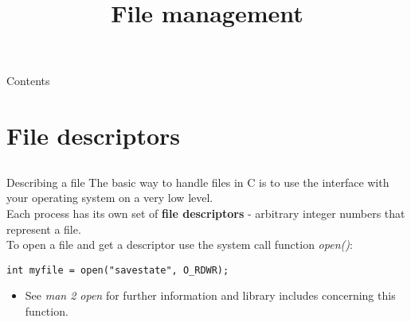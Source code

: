 
\newcommand{\topic}{
	File management
}

\title{\topic}
\supertitle{\course}
\date{}



\maketitle

\begin{frame}{Contents}
	\tableofcontents
\end{frame}

\section{File descriptors}
\subsection{}

\begin{frame}[fragile]{Describing a file}
	The basic way to handle files in C is to use the interface with your operating system on a very low level.\\
	Each process has its own set of \textbf{file descriptors} - arbitrary integer numbers that represent a file.\\ \bigskip
	To open a file and get a descriptor use the system call function \textit{open()}:\\

	\begin{lstlisting}
int myfile = open("savestate", O_RDWR);
\end{lstlisting}

	\begin{itemize}
		\item See \textit{man 2 open} for further information and library includes concerning this function.
	\end{itemize}

\end{frame}

